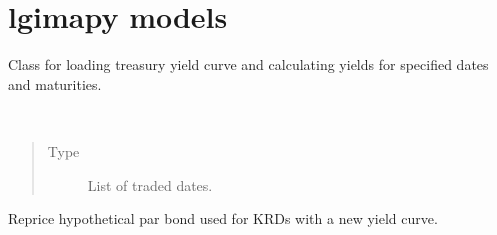 \documentclass[letterpaper,10pt,english]{report}
\begin{document}
\chapter{lgimapy models}
\label{\detokenize{index:module-lgimapy.models}}\label{\detokenize{index:lgimapy-models}}

\begin{fulllineitems}
\label{\detokenize{index:lgimapy.models.TreasuryCurve}}
Class for loading treasury yield curve and calculating yields
for specified dates and maturities.

\begin{fulllineitems}
\label{\detokenize{index:lgimapy.models.TreasuryCurve.trade_dates}}~\begin{quote}\begin{description}
\item[{Type}] \leavevmode
List of traded dates.

\end{description}\end{quote}

\end{fulllineitems}



\begin{fulllineitems}
\end{fulllineitems}


\begin{fulllineitems}
\label{\detokenize{index:lgimapy.models.TreasuryCurve.get_KRD_total_returns}}
Reprice hypothetical par bond used for
KRDs with a new yield curve.


\end{fulllineitems}
\end{fulllineitems}
\end{document}
